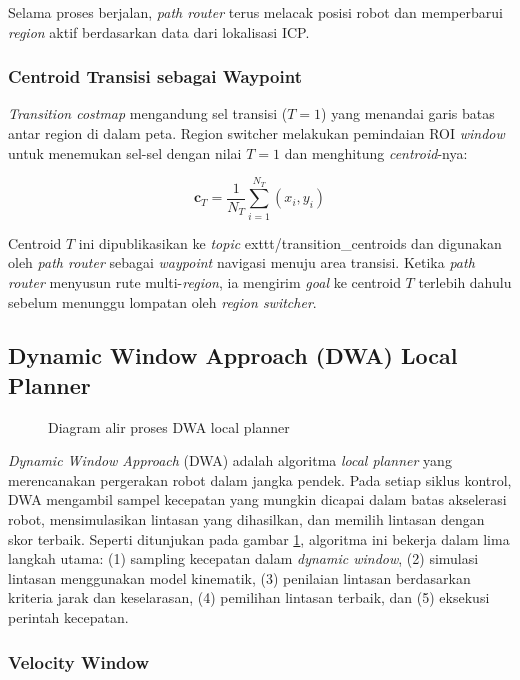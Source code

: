 Selama proses berjalan, \emph{path router} terus melacak posisi robot
dan memperbarui \emph{region} aktif berdasarkan data dari lokalisasi
ICP.

\subsubsection{Centroid Transisi sebagai Waypoint}

\emph{Transition costmap} mengandung sel transisi ($T = 1$) yang menandai
garis batas antar region di dalam peta. Region switcher melakukan pemindaian
ROI \emph{window} untuk menemukan sel-sel dengan nilai $T = 1$ dan menghitung
\emph{centroid}-nya:

\begin{equation}
\mathbf{c}_{T} = \frac{1}{N_{T}} \sum_{i=1}^{N_{T}} (x_i, y_i)
\end{equation}

Centroid $T$ ini dipublikasikan ke \emph{topic}
	exttt{/transition\_centroids} dan digunakan oleh \emph{path router}
sebagai \emph{waypoint} navigasi menuju area transisi. Ketika \emph{path
router} menyusun rute multi-\emph{region}, ia mengirim \emph{goal} ke
centroid $T$ terlebih dahulu sebelum menunggu lompatan oleh \emph{region
switcher}.

\subsection{Dynamic Window Approach (DWA) Local Planner}

\begin{figure}[H]
\centering

\caption{Diagram alir proses DWA local planner}
\label{fig:dwa_flow}
\end{figure}

\emph{Dynamic Window Approach} (DWA) adalah algoritma \emph{local
planner} yang merencanakan pergerakan robot dalam jangka pendek.
Pada setiap siklus kontrol, DWA mengambil sampel kecepatan yang
mungkin dicapai dalam batas akselerasi robot, mensimulasikan
lintasan yang dihasilkan, dan memilih lintasan dengan skor terbaik.
Seperti ditunjukan pada gambar \ref{fig:dwa_flow}, algoritma ini bekerja dalam lima langkah utama: (1) sampling
kecepatan dalam \emph{dynamic window}, (2) simulasi lintasan
menggunakan model kinematik, (3) penilaian lintasan berdasarkan
kriteria jarak dan keselarasan, (4) pemilihan lintasan terbaik,
dan (5) eksekusi perintah kecepatan.

\subsubsection{Velocity Window}

